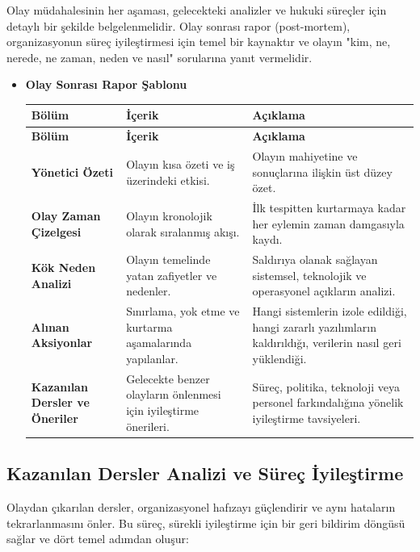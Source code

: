 \begin{itemize}
Olay müdahalesinin her aşaması, gelecekteki analizler ve hukuki süreçler için detaylı bir şekilde belgelenmelidir. Olay sonrası rapor (post-mortem), organizasyonun süreç iyileştirmesi için temel bir kaynaktır ve olayın "kim, ne, nerede, ne zaman, neden ve nasıl" sorularına yanıt vermelidir.

\begin{itemize}
    \item \textbf{Olay Sonrası Rapor Şablonu}
    
    \begin{longtable}{|p{3cm}|p{4cm}|p{5.5cm}|}
    \hline
    \textbf{Bölüm} & \textbf{İçerik} & \textbf{Açıklama} \\
    \hline
    \endfirsthead
    \hline
    \textbf{Bölüm} & \textbf{İçerik} & \textbf{Açıklama} \\
    \hline
    \endhead
    \textbf{Yönetici Özeti} & Olayın kısa özeti ve iş üzerindeki etkisi. & Olayın mahiyetine ve sonuçlarına ilişkin üst düzey özet. \\
    \hline
    \textbf{Olay Zaman Çizelgesi} & Olayın kronolojik olarak sıralanmış akışı. & İlk tespitten kurtarmaya kadar her eylemin zaman damgasıyla kaydı. \\
    \hline
    \textbf{Kök Neden Analizi} & Olayın temelinde yatan zafiyetler ve nedenler. & Saldırıya olanak sağlayan sistemsel, teknolojik ve operasyonel açıkların analizi. \\
    \hline
    \textbf{Alınan Aksiyonlar} & Sınırlama, yok etme ve kurtarma aşamalarında yapılanlar. & Hangi sistemlerin izole edildiği, hangi zararlı yazılımların kaldırıldığı, verilerin nasıl geri yüklendiği. \\
    \hline
    \textbf{Kazanılan Dersler ve Öneriler} & Gelecekte benzer olayların önlenmesi için iyileştirme önerileri. & Süreç, politika, teknoloji veya personel farkındalığına yönelik iyileştirme tavsiyeleri. \\
    \hline
    \end{longtable}
\end{itemize}

\subsection{Kazanılan Dersler Analizi ve Süreç İyileştirme}

Olaydan çıkarılan dersler, organizasyonel hafızayı güçlendirir ve aynı hataların tekrarlanmasını önler. Bu süreç, sürekli iyileştirme için bir geri bildirim döngüsü sağlar ve dört temel adımdan oluşur:


\end{itemize}
